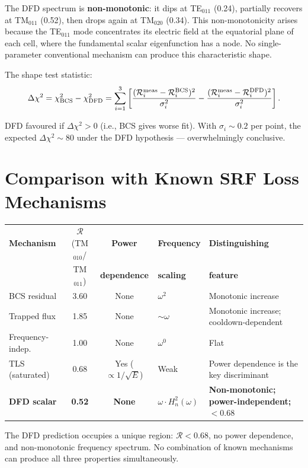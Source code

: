 \documentclass[11pt]{article}
\newcommand{\Rq}{\mathcal{R}}
\newcommand{\Heff}{H_n}
\begin{document}
The DFD spectrum is \textbf{non-monotonic}: it dips at TE$_{011}$
(0.24), partially recovers at TM$_{011}$ (0.52), then drops again at
TM$_{020}$ (0.34). This non-monotonicity arises because the TE$_{011}$
mode concentrates its electric field at the equatorial plane of each
cell, where the fundamental scalar eigenfunction has a node. No
single-parameter conventional mechanism can produce this characteristic
shape.

The shape test statistic:
\begin{equation}
\Delta\chi^2 = \chi^2_{\rm BCS} - \chi^2_{\rm DFD}
= \sum_{i=1}^{3} \left[
\frac{(\Rq_i^{\rm meas} - \Rq_i^{\rm BCS})^2}
{\sigma_i^2}
- \frac{(\Rq_i^{\rm meas} - \Rq_i^{\rm DFD})^2}
{\sigma_i^2}
\right].
\end{equation}

DFD favoured if $\Delta\chi^2 > 0$ (i.e., BCS gives worse fit).
With $\sigma_i \sim 0.2$ per point, the expected $\Delta\chi^2 \sim 80$
under the DFD hypothesis --- overwhelmingly conclusive.


\section{Comparison with Known SRF Loss Mechanisms}
\label{app:mechanisms}

\begin{center}
\renewcommand{\arraystretch}{1.3}
\begin{tabular}{@{}p{3cm}ccp{4cm}p{3cm}@{}}
\toprule
\textbf{Mechanism} & $\Rq$(TM$_{010}$/ & \textbf{Power} &
\textbf{Frequency} & \textbf{Distinguishing} \\
& TM$_{011}$) & \textbf{dependence} & \textbf{scaling} &
\textbf{feature} \\
\midrule
BCS residual & 3.60 & None & $\omega^2$ & Monotonic increase \\
Trapped flux & 1.85 & None & $\sim \omega$ & Monotonic increase;
cooldown-dependent \\
Frequency-indep.\ & 1.00 & None & $\omega^0$ & Flat \\
TLS (saturated) & 0.68 & Yes ($\propto 1/\sqrt{E}$) & Weak & Power
dependence is the key discriminant \\
\textbf{DFD scalar} & \textbf{0.52} & \textbf{None} &
$\omega\cdot\Heff^2(\omega)$ & \textbf{Non-monotonic; power-independent;
$< 0.68$} \\
\bottomrule
\end{tabular}
\end{center}

The DFD prediction occupies a unique region: $\Rq < 0.68$, no power
dependence, and non-monotonic frequency spectrum. No combination of
known mechanisms can produce all three properties simultaneously.
\end{document}

